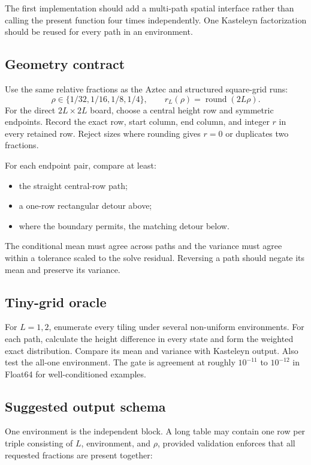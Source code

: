 \documentclass[11pt,a4paper,oneside,openany]{memoir}
\newcommand{\1}{\bm{1}}
\begin{document}
The first implementation should add a multi-path spatial interface rather
than calling the present function four times independently. One Kasteleyn
factorization should be reused for every path in an environment.

\subsection{Geometry contract}

Use the same relative fractions as the Aztec and structured square-grid runs:
\[
  \rho\in\{1/32,1/16,1/8,1/4\},
  \qquad r_L(\rho)=\operatorname{round}(2L\rho).
\]
For the direct $2L\times2L$ board, choose a central height row and symmetric
endpoints. Record the exact row, start column, end column, and integer $r$ in
every retained row. Reject sizes where rounding gives $r=0$ or duplicates two
fractions.

For each endpoint pair, compare at least:

\begin{itemize}
  \item the straight central-row path;
  \item a one-row rectangular detour above;
  \item where the boundary permits, the matching detour below.
\end{itemize}

The conditional mean must agree across paths and the variance must agree
within a tolerance scaled to the solve residual. Reversing a path should
negate its mean and preserve its variance.

\subsection{Tiny-grid oracle}

For $L=1,2$, enumerate every tiling under several non-uniform environments.
For each path, calculate the height difference in every state and form the
weighted exact distribution. Compare its mean and variance with Kasteleyn
output. Also test the all-one environment. The gate is agreement at roughly
$10^{-11}$ to $10^{-12}$ in Float64 for well-conditioned examples.

\subsection{Suggested output schema}

One environment is the independent block. A long table may contain one row per
triple consisting of $L$, environment, and $\rho$, provided validation enforces that all requested
fractions are present together:
\end{document}
